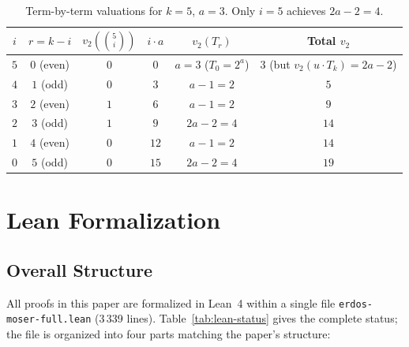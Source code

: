 \documentclass[12pt,a4paper]{article}
\theoremstyle{plain}
\theoremstyle{definition}
\begin{document}
\begin{table}[htbp]
\centering
\caption{Term-by-term valuations for $k=5$, $a=3$.  Only $i=5$ achieves $2a-2 = 4$.}
\label{tab:term-val}
\begin{tabular}{cccccc}
\toprule
$i$ & $r = k-i$ & $v_2(\binom{5}{i})$ & $i \cdot a$ & $v_2(T_r)$ & Total $v_2$ \\
\midrule
$5$ & $0$ (even) & $0$ & $0$ & $a=3$ ($T_0=2^a$) & $3$ (but $v_2(u \cdot T_k) = 2a-2$) \\
$4$ & $1$ (odd)  & $0$ & $3$ & $a-1=2$ & $5$ \\
$3$ & $2$ (even) & $1$ & $6$ & $a-1=2$ & $9$ \\
$2$ & $3$ (odd)  & $1$ & $9$ & $2a-2=4$ & $14$ \\
$1$ & $4$ (even) & $0$ & $12$ & $a-1=2$ & $14$ \\
$0$ & $5$ (odd)  & $0$ & $15$ & $2a-2=4$ & $19$ \\
\bottomrule
\end{tabular}
\end{table}

\section{Lean Formalization}
\label{sec:lean-formalization}

\subsection{Overall Structure}
\label{sec:lean-structure}

All proofs in this paper are formalized in Lean~4 within a single file
\texttt{erdos-moser-full.lean} (3\,339 lines).  Table~\ref{tab:lean-status}
gives the complete status; the file is organized into four parts matching
the paper's structure:
\end{document}
